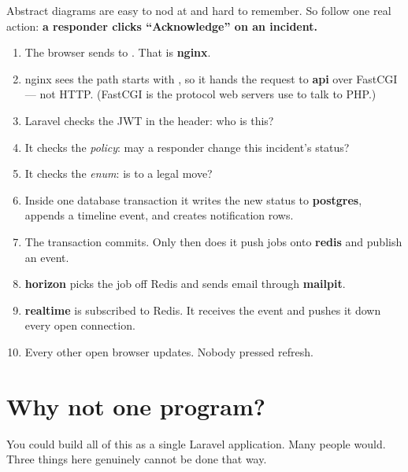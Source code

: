 Abstract diagrams are easy to nod at and hard to remember. So follow one real
action: \textbf{a responder clicks ``Acknowledge'' on an incident.}

\begin{enumerate}[leftmargin=1.5cm]
\item The browser sends  to
  . That is \textbf{nginx}.
\item nginx sees the path starts with , so it hands the request to
  \textbf{api} over FastCGI --- not HTTP. (FastCGI is the protocol web servers
  use to talk to PHP.)
\item Laravel checks the JWT in the  header: who is this?
\item It checks the \emph{policy}: may a responder change this incident's
  status?
\item It checks the \emph{enum}: is  to  a legal
  move?
\item Inside one database transaction it writes the new status to
  \textbf{postgres}, appends a timeline event, and creates notification rows.
\item The transaction commits. Only then does it push jobs onto \textbf{redis}
  and publish an event.
\item \textbf{horizon} picks the job off Redis and sends email through
  \textbf{mailpit}.
\item \textbf{realtime} is subscribed to Redis. It receives the event and pushes
  it down every open connection.
\item Every other open browser updates. Nobody pressed refresh.
\end{enumerate}


\section{Why not one program?}

You could build all of this as a single Laravel application. Many people would.
Three things here genuinely cannot be done that way.

